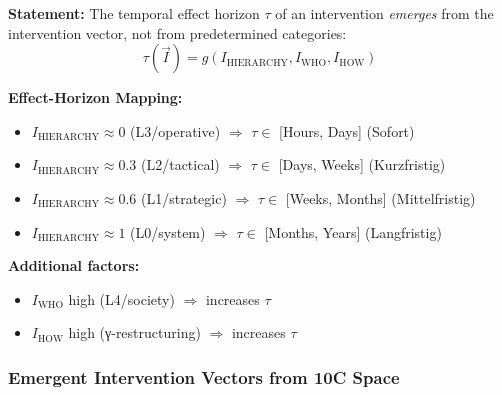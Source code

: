 \begin{tcolorbox}[colback=blue!5!white, colframe=blue!75!black,
    title=\textbf{Axiom EIT-5: Effect-Horizon Emergence}]

\textbf{Statement:} The temporal effect horizon $\tau$ of an intervention \textit{emerges} from the intervention vector, not from predetermined categories:
\begin{equation}
\boxed{\tau(\vec{I}) = g(I_{\text{HIERARCHY}}, I_{\text{WHO}}, I_{\text{HOW}})}
\label{eq:hhh-horizon-emergence}
\end{equation}

\textbf{Effect-Horizon Mapping:}
\begin{itemize}[nosep]
    \item $I_{\text{HIERARCHY}} \approx 0$ (L3/operative) $\Rightarrow$ $\tau \in$ [Hours, Days] (Sofort)
    \item $I_{\text{HIERARCHY}} \approx 0.3$ (L2/tactical) $\Rightarrow$ $\tau \in$ [Days, Weeks] (Kurzfristig)
    \item $I_{\text{HIERARCHY}} \approx 0.6$ (L1/strategic) $\Rightarrow$ $\tau \in$ [Weeks, Months] (Mittelfristig)
    \item $I_{\text{HIERARCHY}} \approx 1$ (L0/system) $\Rightarrow$ $\tau \in$ [Months, Years] (Langfristig)
\end{itemize}

\textbf{Additional factors:}
\begin{itemize}[nosep]
    \item $I_{\text{WHO}}$ high (L4/society) $\Rightarrow$ increases $\tau$
    \item $I_{\text{HOW}}$ high (γ-restructuring) $\Rightarrow$ increases $\tau$
\end{itemize}
\end{tcolorbox}


\subsubsection{Emergent Intervention Vectors from 10C Space}

